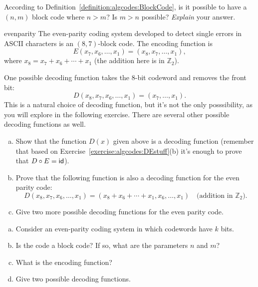 \begin{exercise}{}
According to Definition~\ref{definition:algcodes:BlockCode}, is it possible to have a $(n,m)$ block code where $n > m$? Is $m > n$ possible? \emph{Explain} your answer.
\end{exercise}
 
\begin{example}{evenparity}
The even-parity coding system developed to detect single errors in
ASCII characters is an $(8,7)$-block code. The encoding function is
\[
E(x_7, x_6, \ldots, x_1) = (x_8, x_7,  \ldots, x_1),
\]
where $x_8 = x_7 + x_6 + \cdots + x_1$ (the addition here is in $\mathbb{Z}_2$). 

One possible decoding function takes the 8-bit codeword and removes the front bit:
\[
D(x_8,x_7, x_6, \ldots, x_1) = (x_7,  \ldots, x_1).
\]
This is a natural choice of decoding function, but it's not the only posssibility, as you will explore in the following exercise.
There are several other possible decoding functions as well.  
\end{example}
\begin{exercise}{}
\begin{enumerate}[(a)]
\item
Show that the function $D(x)$ given above is a decoding function (remember that based on Exercise~\ref{exercise:algcodes:DEstuff}(b) it's enough to prove that $D \circ E = \sf{id}$). 
\item
Prove that the following function is also a decoding function for the even parity code:
\[
D(x_8,x_7, x_6, \ldots, x_1) = ( x_8 + x_6 + \cdots + x_1, x_6,  \ldots, x_1)\quad \textrm{(addition in }\mathbb{Z}_2).
\]
\item
Give two more possible decoding functions for the even parity code.
\end{enumerate}
\end{exercise}

\begin{exercise}{}
\begin{enumerate}[(a)]
\item
Consider an even-parity coding system in which codewords have $k$ bits. 
\item
Is the code a block code? If so, what are the parameters $n$ and $m$? 
\item
What is the encoding function? 
\item
Give two possible decoding functions.
\end{enumerate}
\end{exercise}

